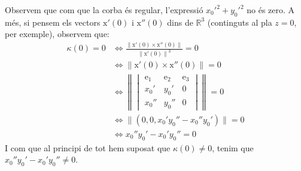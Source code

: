 \documentclass[10pt,a4paper]{article}
\newcommand{\vf}[1]{\boldsymbol{\mathrm{#1}}} %
\newcommand{\RR}{\ensuremath{\mathbb{R}}}
\theoremstyle{definition}
\begin{document}
Observem que com que la corba és regular, l'expressió ${x_0'}^2+{y_0'}^2$ no és zero. A més, si pensem els vectors $\vf{x}'(0)$ i $\vf{x}''(0)$ dins de $\RR^3$ (continguts al pla $z=0$, per exemple), observem que:
\begin{align*}
  \kappa(0)=0 & \iff \frac{\|\vf{x}'(0)\times\vf{x}''(0)\|}{{\|\vf{x}'(0)\|}^3}=0 \\
              & \iff \|\vf{x}'(0)\times\vf{x}''(0)\|=0                            \\
              & \iff  \left\|\begin{vmatrix}
                               \vf{e}_1 & \vf{e}_2 & \vf{e}_3 \\
                               x_0'     & y_0'     & 0        \\
                               x_0''    & y_0''    & 0
                             \end{vmatrix}\right\|=0                       \\
              & \iff \|(0,0,x_0'y_0''-x_0''y_0')\|=0                              \\
              & \iff x_0''y_0'-x_0'y_0''=0
\end{align*}
I com que al principi de tot hem suposat que $\kappa(0)\ne 0$, tenim que $x_0''y_0'-x_0'y_0''\ne 0$.
\end{document}
